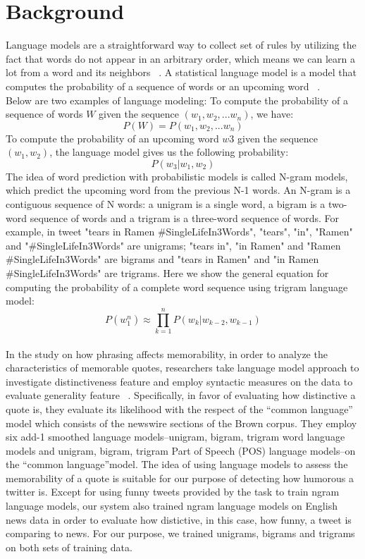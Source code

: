 \documentclass[11pt,a4paper]{article}
\begin{document}
\section{Background}
Language models are a straightforward way to collect set of rules by utilizing the fact that words do not appear in an arbitrary order, which means we can learn a lot from a word and its neighbors ~\cite{de2011natural}. A statistical language model is a model that computes the probability of a sequence of words or an upcoming word ~\cite{JM}.\\
Below are two examples of language modeling:
To compute the probability of a sequence of words $W$ given the sequence $(w_{1},w_{2},...w_{n})$, we have:
\begin{equation}
P(W) = P(w_{1},w_{2},...w_{n})
\end{equation}
To compute the probability of an upcoming word $w3$ given the sequence $(w_{1},w_{2})$, the language model gives us the following probability:
\begin{equation}
P(w_{3}|w_{1},w_{2})
\end{equation}
The idea of word prediction with probabilistic models is called N-gram models, which predict the upcoming word from the previous N-1 words. An N-gram is a contiguous sequence of N words: a unigram is a single word, a bigram is a two-word sequence of words and a trigram is a three-word sequence of words. For example, in tweet "tears in Ramen \#SingleLifeIn3Words", "tears", "in", "Ramen" and "\#SingleLifeIn3Words" are unigrams; "tears in", "in Ramen" and "Ramen \#SingleLifeIn3Words" are bigrams and "tears in Ramen" and "in Ramen \#SingleLifeIn3Words" are trigrams. Here we show the general equation for computing the probability of a complete word sequence using trigram language model:
\begin{equation}
P(w_1^n)\approx \prod_{k=1}^{n} P(w_k|w_{k-2}, w_{k-1})
\end{equation}\\
In the study on how phrasing affects memorability, in order to analyze the characteristics of memorable quotes, researchers take
language model approach to investigate distinctiveness feature and employ syntactic measures on the data to evaluate generality feature ~\cite{hello}. Specifically, in favor of evaluating how distinctive a quote is, they evaluate its likelihood with the respect of the “common language” model which consists of the newswire sections of the Brown corpus. They employ six add-1 smoothed language models–unigram, bigram, trigram word language models and unigram, bigram, trigram Part of Speech (POS) language models–on the “common language”model. The idea of using language models to assess the memorability of a quote is suitable for our purpose of detecting how humorous a twitter is. Except for using funny tweets provided by the task to train ngram language models, our system also trained ngram language models on English news data in order to evaluate how distictive, in this case, how funny, a tweet is comparing to news. For our purpose, we trained unigrams, bigrams and trigrams on both sets of training data.
\end{document}
